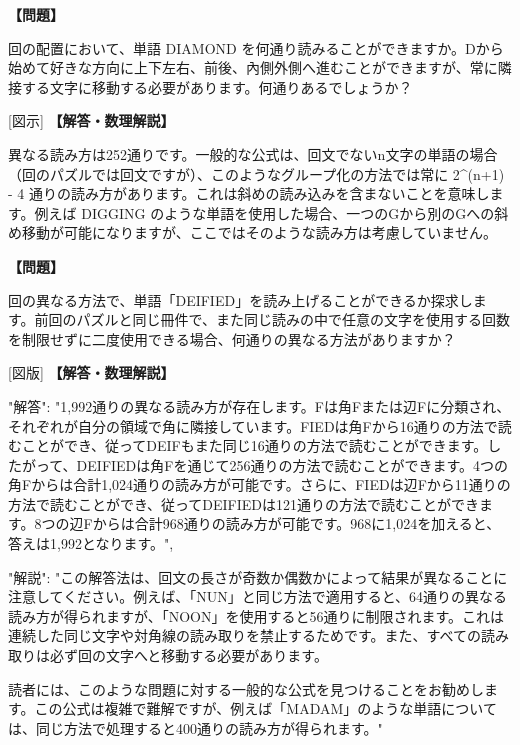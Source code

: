 \documentclass[10pt,a4paper,oneside,openany]{ltjsbook}
\begin{document}
\begin{tcolorbox}[colback=softblue,colframe=primaryblue,title=\textbf{第 256 問：ダイアモンドパズル （原題: THE DIAMOND PUZZLE.）},arc=2mm,boxrule=1pt,breakable]
\textbf{【問題】}\par\vspace{0.3em}
回の配置において、単語 DIAMOND を何通り読みることができますか。Dから始めて好きな方向に上下左右、前後、內側外側へ進むことができますが、常に隣接する文字に移動する必要があります。何通りあるでしょうか？

[図示]
\tcblower
\textbf{【解答・数理解説】}\par\vspace{0.3em}
異なる読み方は252通りです。一般的な公式は、回文でないn文字の単語の場合（回のパズルでは回文ですが）、このようなグループ化の方法では常に 2\textasciicircum{}(n+1) - 4 通りの読み方があります。これは斜めの読み込みを含まないことを意味します。例えば DIGGING のような単語を使用した場合、一つのGから別のGへの斜め移動が可能になりますが、ここではそのような読み方は考慮していません。
\end{tcolorbox}

\begin{tcolorbox}[colback=softblue,colframe=primaryblue,title=\textbf{第 257 問：THE DEIFIED PUZZLE.},arc=2mm,boxrule=1pt,breakable]
\textbf{【問題】}\par\vspace{0.3em}
回の異なる方法で、単語「DEIFIED」を読み上げることができるか探求します。前回のパズルと同じ冊件で、また同じ読みの中で任意の文字を使用する回数を制限せずに二度使用できる場合、何通りの異なる方法がありますか？

[図版]
\tcblower
\textbf{【解答・数理解説】}\par\vspace{0.3em}
{
"解答": "1,992通りの異なる読み方が存在します。Fは角Fまたは辺Fに分類され、それぞれが自分の領域で角に隣接しています。FIEDは角Fから16通りの方法で読むことができ、従ってDEIFもまた同じ16通りの方法で読むことができます。したがって、DEIFIEDは角Fを通じて256通りの方法で読むことができます。4つの角Fからは合計1,024通りの読み方が可能です。さらに、FIEDは辺Fから11通りの方法で読むことができ、従ってDEIFIEDは121通りの方法で読むことができます。8つの辺Fからは合計968通りの読み方が可能です。968に1,024を加えると、答えは1,992となります。",

"解説": "この解答法は、回文の長さが奇数か偶数かによって結果が異なることに注意してください。例えば、「NUN」と同じ方法で適用すると、64通りの異なる読み方が得られますが、「NOON」を使用すると56通りに制限されます。これは連続した同じ文字や対角線の読み取りを禁止するためです。また、すべての読み取りは必ず回の文字へと移動する必要があります。

読者には、このような問題に対する一般的な公式を見つけることをお勧めします。この公式は複雑で難解ですが、例えば「MADAM」のような単語については、同じ方法で処理すると400通りの読み方が得られます。"
}
\end{tcolorbox}
\end{document}
